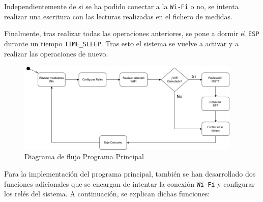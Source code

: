 \begin{itemize}
Independientemente de si se ha podido conectar a la \texttt{Wi-Fi} o no, se intenta realizar una escritura con las lecturas realizadas en el fichero de medidas.

Finalmente, tras realizar todas las operaciones anteriores, se pone a dormir el \texttt{ESP} durante un tiempo \texttt{TIME\_SLEEP}. Tras esto el sistema se vuelve a activar y a realizar las operaciones de nuevo.

\begin{figure}[H]
    \centering
    \includegraphics[width=0.95\textwidth]{images/3-software/3-3-programaprincipal/DiagramaDeFlujoPOWER.jpg}
    \caption{Diagrama de flujo Programa Principal}
    \label{fig:3-3-1-DiagramaFlujo}
\end{figure}
\end{itemize}

Para la implementación del programa principal, también se han desarrollado dos funciones adicionales que se encargan de intentar la conexión \texttt{Wi-Fi} y configurar los relés del sistema. A continuación, se explican dichas funciones:

